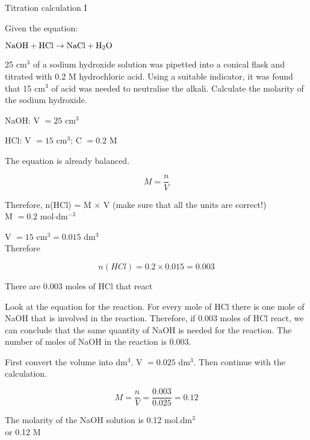 \begin{wex}{Titration calculation I}{Given the equation:
\begin{center}
$\rm{NaOH + HCl \rightarrow NaCl + H_{2}O}$
\end{center}
25 cm$^{3}$ of a sodium hydroxide solution was pipetted into a conical flask and titrated with 0.2 M hydrochloric acid. Using a suitable indicator, it was found that 15 cm$^{3}$ of acid was needed to neutralise the alkali. Calculate the molarity of the sodium hydroxide.}{

NaOH: V $= 25$ cm$^{3}$

HCl: V $= 15$ cm$^{3}$; C $= 0.2$ M

The equation is already balanced.

\begin{equation*}
M = \frac{n}{V}
\end{equation*}

Therefore, n(HCl) = M $\times$ V (make sure that all the units are correct!)\\

M $= 0.2$ mol$\cdot$dm$^{-3}$

V $= 15$ cm$^{3} = 0.015$ dm$^{3}$ \\

Therefore

\begin{equation*}
n(HCl) = 0.2 \times 0.015 = 0.003
\end{equation*}

There are 0.003 moles of HCl that react

Look at the equation for the reaction. For every mole of HCl there is one mole of NaOH that is involved in the reaction. Therefore, if 0.003 moles of HCl react, we can conclude that the same quantity of NaOH is needed for the reaction. The number of moles of NaOH in the reaction is 0.003.

First convert the volume into dm$^{3}$. V $= 0.025$ dm$^{3}$. Then continue with the calculation.

\begin{equation*}
M = \dfrac{n}{V} = \frac{0.003}{0.025} = 0.12
\end{equation*}

The molarity of the NaOH solution is 0.12 mol.dm$^{3}$ \\or 0.12 M
}
\end{wex}

